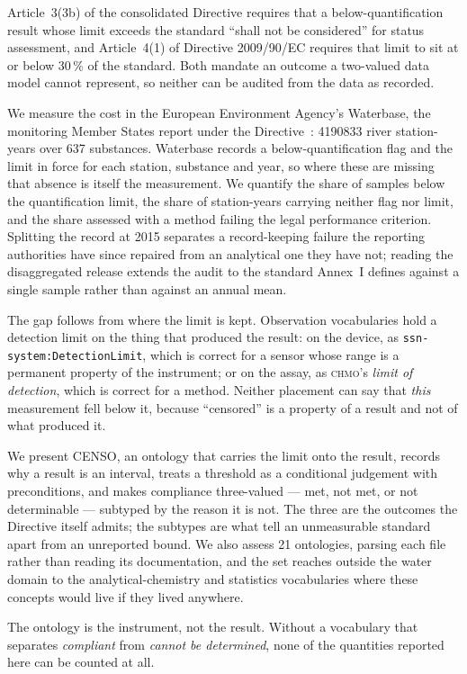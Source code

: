 Article~3(3b) of the consolidated Directive requires that a below-quantification
result whose limit exceeds the standard ``shall not be considered'' for status
assessment, and Article~4(1) of Directive 2009/90/EC requires that limit to sit
at or below \num{30}\,\% of the standard. Both mandate an outcome a two-valued
data model cannot represent, so neither can be audited from the data as
recorded.

We measure the cost in the European Environment Agency's Waterbase, the
monitoring Member States report under the Directive~\cite{eea_waterbase}:
\num{4190833} river station-years over \num{637} substances. Waterbase records a
below-quantification flag and the limit in force for each station, substance and
year, so where these are missing that absence is itself the measurement. We
quantify the share of samples below the quantification limit, the share of
station-years carrying neither flag nor limit, and the share assessed with a
method failing the legal performance criterion. Splitting the record at
\num{2015} separates a record-keeping failure the reporting authorities have
since repaired from an analytical one they have not; reading the disaggregated
release extends the audit to the standard Annex~I defines against a single
sample rather than against an annual mean.

The gap follows from where the limit is kept. Observation vocabularies hold a
detection limit on the thing that produced the result: on the device, as
\texttt{ssn-system:DetectionLimit}, which is correct for a sensor whose range is
a permanent property of the instrument; or on the assay, as \textsc{chmo}'s
\emph{limit of detection}, which is correct for a method. Neither placement can
say that \emph{this} measurement fell below it, because ``censored'' is a
property of a result and not of what produced it.

We present CENSO, an ontology that carries the limit onto the result, records
why a result is an interval, treats a threshold as a conditional judgement with preconditions,
and makes compliance three-valued --- met, not met, or not determinable ---
subtyped by the reason it is not. The three are the outcomes the Directive
itself admits; the subtypes are what tell an unmeasurable standard apart from an
unreported bound. We also assess \num{21} ontologies, parsing each file rather
than reading its documentation, and the set reaches outside the water domain to
the analytical-chemistry and statistics vocabularies where these concepts would
live if they lived anywhere.

The ontology is the instrument, not the result. Without a vocabulary that
separates \emph{compliant} from \emph{cannot be determined}, none of the
quantities reported here can be counted at all.
